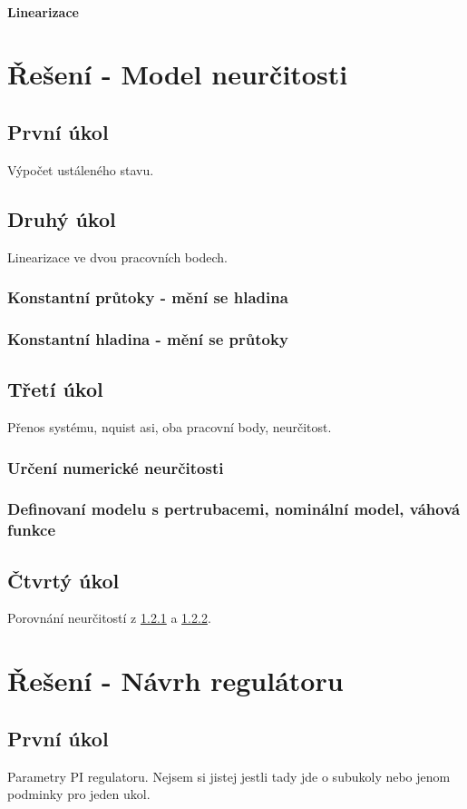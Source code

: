 \documentclass[12pt,a4paper]{article}
\begin{document}
\paragraph*{Linearizace}

\section{Řešení - Model neurčitosti}
\subsection{První úkol}
Výpočet ustáleného stavu.
\subsection{Druhý úkol}
Linearizace ve dvou pracovních bodech.
\subsubsection{Konstantní průtoky - mění se hladina}
\label{sec:2A}
\subsubsection{Konstantní hladina - mění se průtoky}
\label{sec:2B}
\subsection{Třetí úkol}
Přenos systému, nquist asi, oba pracovní body, neurčitost.
\subsubsection{Určení numerické neurčitosti}
\subsubsection{Definovaní modelu s pertrubacemi, nominální model, váhová funkce}
\subsection{Čtvrtý úkol}
Porovnání neurčitostí z \ref{sec:2A} a \ref{sec:2B}.
\section{Řešení - Návrh regulátoru}
\subsection{První úkol}
Parametry PI regulatoru. Nejsem si jistej jestli tady jde o subukoly nebo jenom podminky pro jeden ukol.
\end{document}
